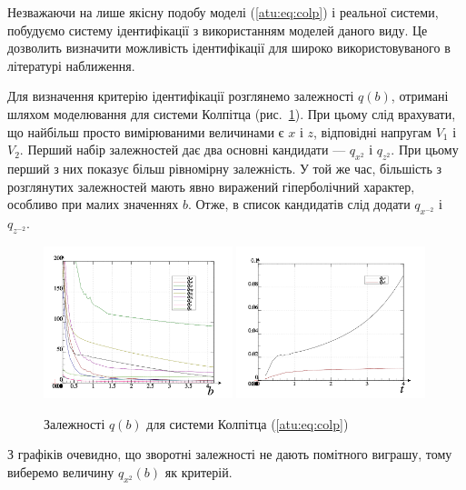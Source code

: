 Незважаючи на лише якісну подобу моделі (\ref{atu:eq:colp}) і реальної
системи, побудуємо систему ідентифікації з використанням
моделей даного виду. Це дозволить визначити можливість
ідентифікації для широко використовуваного в літературі
наближення.

Для визначення критерію ідентифікації розглянемо залежності
$q(b)$, отримані шляхом моделювання для системи Колпітца
(рис.~\ref{atu:f:colp_q}). При цьому слід врахувати, що найбільш просто
вимірюваними величинами є
$x$ і $z$, відповідні напругам
$ V_1 $ і $ V_2 $. Перший набір залежностей дає два основні кандидати ---
$ q_{x^2} $ і $ q_{z^2} $.
При цьому перший з них показує більш рівномірну
залежність. У той же час, більшість з розглянутих залежностей
мають явно виражений гіперболічний характер, особливо при
малих значеннях
$ b $. Отже, в список кандидатів слід додати
$ q_{x^{-2}} $ і $ q_{z^{-2}} $.

\begin{figure}[htb!]
\centerline{
  \includegraphics[width=0.49\textwidth]{p/mod/colp_p-p_b_e.png}
  \includegraphics[width=0.49\textwidth]{p/mod/colp_p-p_b_1ex2.png}
}
  \caption{Залежності $q(b) $ для системи Колпітца (\ref{atu:eq:colp})}
\label{atu:f:colp_q}
\end{figure}

З графіків очевидно, що зворотні залежності не дають помітного
виграшу, тому виберемо величину
$ q_{x^2} (b) $ як критерій.


